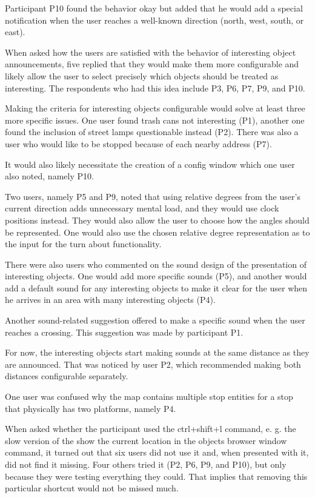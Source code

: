 \documentclass[nolof,digital]{fithesis3}
\begin{document}
Participant P10 found the behavior okay but added that he would add a special notification when the user reaches a well-known direction (north, west, south, or east).

When asked how the users are satisfied with the behavior of interesting object announcements, five replied that they would make them more configurable and likely allow the user to select precisely which objects should be treated as interesting. The respondents who had this idea include P3, P6, P7, P9, and P10.

Making the criteria for interesting objects configurable would solve at least three more specific issues. One user found trash cans not interesting (P1), another one found the inclusion of street lamps questionable instead (P2). There was also a user who would like to be stopped because of each nearby address (P7).

It would also likely necessitate the creation of a config window which one user also noted, namely P10.

Two users, namely  P5 and P9, noted that using relative degrees from the user's current direction adds unnecessary mental load, and they would use clock positions instead. They would also allow the user to choose how the angles should be represented. One would also use the chosen relative degree representation as to the input for the turn about functionality.

There were also users who commented on the sound design of the presentation of interesting objects. One would add more specific sounds (P5), and another would add a default sound for any interesting objects to make it clear for the user when he arrives in an area with many interesting objects (P4).

Another sound-related suggestion offered to make a specific sound when the user reaches a crossing. This suggestion was made by participant P1.

For now, the interesting objects start making sounds at the same distance as they are announced. That was noticed by user P2, which recommended making both distances configurable separately.

One user was confused why the map contains multiple stop entities for a stop that physically has two platforms, namely P4.

When asked whether the participant used the ctrl+shift+l command, e. g. the slow version of the show the current location in the objects browser window command, it turned out that six users did not use it and, when presented with it, did not find it missing. Four others tried it (P2, P6, P9, and P10), but only because they were testing everything they could. That implies that removing this particular shortcut would not be missed much.
\end{document}
